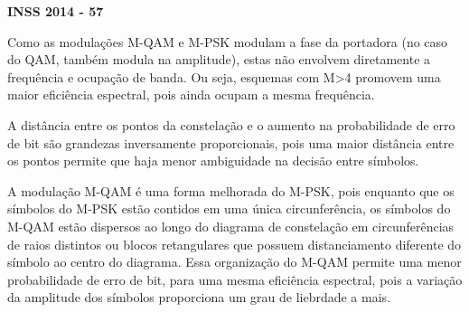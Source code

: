 \textbf{INSS 2014 - 57}

Como as modulações M-QAM e M-PSK modulam a fase da portadora (no caso do QAM, também modula na amplitude), estas não envolvem diretamente a frequência e ocupação de banda. Ou seja, esquemas com M>4 promovem uma maior eficiência espectral, pois ainda ocupam a mesma frequência.

A distância entre os pontos da constelação e o aumento na probabilidade de erro de bit são grandezas inversamente proporcionais, pois uma maior distância entre os pontos permite que haja menor ambiguidade na decisão entre símbolos.

A modulação M-QAM é uma forma melhorada do M-PSK, pois enquanto que os símbolos do M-PSK estão contidos em uma única circunferência, os símbolos do M-QAM estão dispersos ao longo do diagrama de constelação em circunferências de raios distintos ou blocos retangulares que possuem distanciamento diferente do símbolo ao centro do diagrama. Essa organização do M-QAM permite uma menor probabilidade de erro de bit, para uma mesma eficiência espectral, pois a variação da amplitude dos símbolos proporciona um grau de liebrdade a mais.